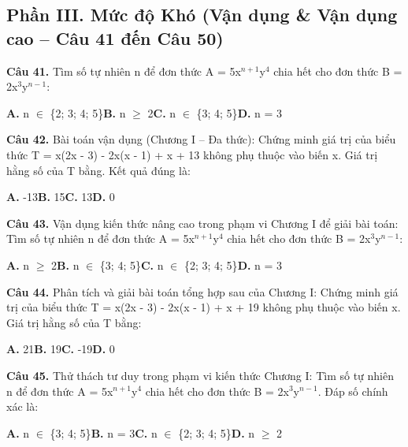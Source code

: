 \documentclass[11pt,a4paper]{article}
\begin{document}
\subsection*{\color{accent} Phần III. Mức độ Khó (Vận dụng \& Vận dụng cao -- Câu 41 đến Câu 50)}
\textbf{\color{primary} Câu 41.} Tìm số tự nhiên n để đơn thức A = 5x$^{n+1}$y$^4$ chia hết cho đơn thức B = 2x$^3$y$^{n-1}$:\par
\hspace*{1.5em}\textbf{A.} n $\in$ \{2; 3; 4; 5\}\quad\quad \textbf{B.} n $\ge$ 2\quad\quad \textbf{C.} n $\in$ \{3; 4; 5\}\quad\quad \textbf{D.} n = 3\par\vspace{2pt}
\textbf{\color{primary} Câu 42.} Bài toán vận dụng (Chương I – Đa thức): Chứng minh giá trị của biểu thức T = x(2x - 3) - 2x(x - 1) + x + 13 không phụ thuộc vào biến x. Giá trị hằng số của T bằng. Kết quả đúng là:\par
\hspace*{1.5em}\textbf{A.} -13\quad\quad \textbf{B.} 15\quad\quad \textbf{C.} 13\quad\quad \textbf{D.} 0\par\vspace{2pt}
\textbf{\color{primary} Câu 43.} Vận dụng kiến thức nâng cao trong phạm vi Chương I để giải bài toán: Tìm số tự nhiên n để đơn thức A = 5x$^{n+1}$y$^4$ chia hết cho đơn thức B = 2x$^3$y$^{n-1}$:\par
\hspace*{1.5em}\textbf{A.} n $\ge$ 2\quad\quad \textbf{B.} n $\in$ \{3; 4; 5\}\quad\quad \textbf{C.} n $\in$ \{2; 3; 4; 5\}\quad\quad \textbf{D.} n = 3\par\vspace{2pt}
\textbf{\color{primary} Câu 44.} Phân tích và giải bài toán tổng hợp sau của Chương I: Chứng minh giá trị của biểu thức T = x(2x - 3) - 2x(x - 1) + x + 19 không phụ thuộc vào biến x. Giá trị hằng số của T bằng:\par
\hspace*{1.5em}\textbf{A.} 21\quad\quad \textbf{B.} 19\quad\quad \textbf{C.} -19\quad\quad \textbf{D.} 0\par\vspace{2pt}
\textbf{\color{primary} Câu 45.} Thử thách tư duy trong phạm vi kiến thức Chương I: Tìm số tự nhiên n để đơn thức A = 5x$^{n+1}$y$^4$ chia hết cho đơn thức B = 2x$^3$y$^{n-1}$. Đáp số chính xác là:\par
\hspace*{1.5em}\textbf{A.} n $\in$ \{3; 4; 5\}\quad\quad \textbf{B.} n = 3\quad\quad \textbf{C.} n $\in$ \{2; 3; 4; 5\}\quad\quad \textbf{D.} n $\ge$ 2\par\vspace{2pt}
\end{document}
